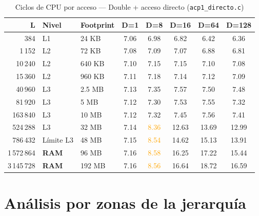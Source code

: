 \documentclass[12pt,a4paper]{article}
\newcommand{\verde}[1]{\textcolor{verde}{#1}}
\newcommand{\amarillo}[1]{\textcolor{orange}{#1}}
\newcommand{\rojo}[1]{\textcolor{rojo}{#1}}
\begin{document}
\begin{table}[H]
\centering
\caption{Ciclos de CPU por acceso — Double + acceso directo (\texttt{acp1\_directo.c})}
\label{tab:double_dir}
\setlength{\tabcolsep}{5pt}
\begin{tabular}{rllccccc}
\toprule
\textbf{L} & \textbf{Nivel} & \textbf{Footprint} & \textbf{D=1} & \textbf{D=8} & \textbf{D=16} & \textbf{D=64} & \textbf{D=128} \\
\midrule
384        & L1         & 24 KB   & \verde{7.06} & \verde{6.98} & \verde{6.82} & \verde{6.42} & \verde{6.36} \\
1\,152     & L2         & 72 KB   & \verde{7.08} & \verde{7.09} & \verde{7.07} & \verde{6.88} & \verde{6.81} \\
10\,240    & L2         & 640 KB  & \verde{7.10} & \verde{7.15} & \verde{7.15} & \verde{7.10} & \verde{7.08} \\
15\,360    & L2         & 960 KB  & \verde{7.11} & \verde{7.18} & \verde{7.14} & \verde{7.12} & \verde{7.09} \\
40\,960    & L3         & 2.5 MB  & \verde{7.13} & \verde{7.35} & \verde{7.57} & \verde{7.50} & \verde{7.48} \\
81\,920    & L3         & 5 MB    & \verde{7.12} & \verde{7.30} & \verde{7.53} & \verde{7.55} & \verde{7.32} \\
163\,840   & L3         & 10 MB   & \verde{7.12} & \verde{7.32} & \verde{7.45} & \verde{7.56} & \verde{7.41} \\
524\,288   & L3         & 32 MB   & \verde{7.14} & \amarillo{8.36} & \rojo{12.63} & \rojo{13.69} & \rojo{12.99} \\
786\,432   & Límite L3  & 48 MB   & \verde{7.15} & \amarillo{8.54} & \rojo{14.62} & \rojo{15.13} & \rojo{13.91} \\
1\,572\,864 & \textbf{RAM} & 96 MB & \verde{7.16} & \amarillo{8.58} & \rojo{16.25} & \rojo{17.22} & \rojo{15.44} \\
3\,145\,728 & \textbf{RAM} & 192 MB & \verde{7.16} & \amarillo{8.56} & \rojo{16.64} & \rojo{18.72} & \rojo{16.59} \\
\bottomrule
\end{tabular}
\end{table}

\section{Análisis por zonas de la jerarquía}
\end{document}
